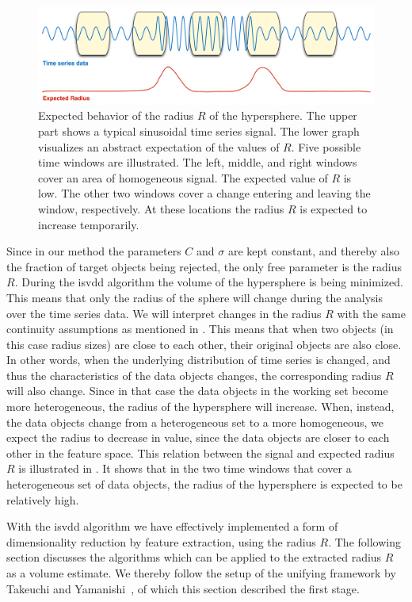 \begin{figure}
  \centering
    \includegraphics[width=\textwidth,height=\textheight,keepaspectratio]{./Figures/chapter4/expected_behaviour.pdf}
  \caption[Expected radius behavior]{Expected behavior of the radius $R$ of the hypersphere. The upper part shows a typical sinusoidal time series signal. The lower graph visualizes an abstract expectation of the values of $R$. Five possible time windows are illustrated. The left, middle, and right windows cover an area of homogeneous signal. The expected value of $R$ is low. The other two windows cover a change entering and leaving the window, respectively. At these locations the radius $R$ is expected to increase temporarily.}
  \label{fig:radius_expectation}
\end{figure}

Since in our method the parameters $C$ and $\sigma$ are kept constant, and thereby also the fraction of target objects being rejected, the only free parameter is the radius $R$.
During the \gls{isvdd} algorithm the volume of the hypersphere is being minimized.
This means that only the radius of the sphere will change during the analysis over the time series data.
We will interpret changes in the radius $R$ with the same continuity assumptions as mentioned in .
This means that when two objects (in this case radius sizes) are close to each other, their original objects are also close.
In other words, when the underlying distribution of time series is changed, and thus the characteristics of the data objects changes, the corresponding radius $R$ will also change.
Since in that case the data objects in the working set become more heterogeneous, the radius of the hypersphere will increase.
When, instead, the data objects change from a heterogeneous set to a more homogeneous, we expect the radius to decrease in value, since the data objects are closer to each other in the feature space.
This relation between the signal and expected radius $R$ is illustrated in .
It shows that in the two time windows that cover a heterogeneous set of data objects, the radius of the hypersphere is expected to be relatively high.

With the \gls{isvdd} algorithm we have effectively implemented a form of dimensionality reduction by feature extraction, using the radius $R$.
The following section discusses the algorithms which can be applied to the extracted radius $R$ as a volume estimate.
We thereby follow the setup of the unifying framework by Takeuchi and Yamanishi~\cite{takeuchi2006unifying}, of which this section described the first stage.